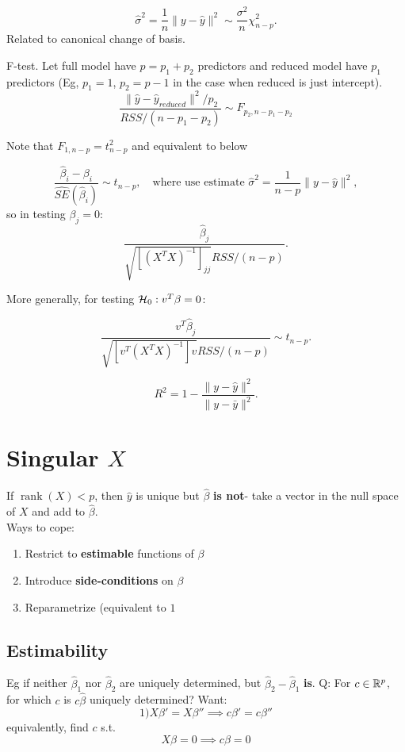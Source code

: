 \documentclass{article}
\newcommand{\rank}{\operatorname{rank}}
\begin{document}
\begin{fact}
$$\hat \sigma^2 = \frac{1}{n} \|y - \hat y\|^2 \sim \frac{\sigma^2}{n} \chi^2_{n-p}.$$
Related to canonical change of basis. 
\end{fact}
\begin{fact}[F-Test]
F-test. Let full model have $p = p_1 + p_2$ predictors and reduced model have $p_1$ predictors (Eg, $p_1 = 1$, $p_2 = p-1$ in the case when reduced is just intercept).
$$\frac{\|\hat y - \hat y_{reduced} \|^2/p_2}{RSS/(n-p_1 - p_2)}\sim F_{p_2, n-p_1 - p_2}$$

Note that $F_{1,n-p} = t^2_{n-p}$ and equivalent to below
\end{fact}
\begin{fact}[T-test]
$$\frac{\hat \beta_i - \beta_i}{\widehat{SE} (\hat \beta_i)} \sim t_{n-p}, \quad \text{where use estimate }  \hat \sigma^2 = \frac{1}{n-p} \|y-\hat y\|^2,$$
so in testing $\beta_j = 0$:
$$\frac{\hat \beta_j }{\sqrt{ [(X^TX)^{-1} ]_{jj}}RSS/(n-p)}.$$

More generally, for testing $\mathcal H_0: v^T \beta = 0$:

$$\frac{v^T \hat \beta_j }{\sqrt{ [v^T (X^TX)^{-1} ]v}RSS/(n-p)}\sim t_{n-p}.$$
\end{fact}


\begin{definition}[$R^2$]
    $$R^2 = 1 - \frac{\|y - \hat y\|^2}{\| y - \bar y\|^2}.$$
\end{definition}


\section{Singular $X$}
If $\rank(X)<p$, then $\hat y$ is unique but $\hat \beta$ \textbf{is not}- take a vector in the null space of $X$ and add to $\hat \beta$. \\
Ways to cope:
\begin{enumerate}
    \item Restrict to \textbf{estimable} functions of $\beta$
    \item Introduce \textbf{side-conditions} on $\beta$
    \item Reparametrize (equivalent to $1$

\end{enumerate}
\subsection{Estimability}
Eg if neither $\hat \beta_1$ nor $\hat \beta_2$ are uniquely determined, but $\hat \beta_2 - \hat \beta_1$ \textbf{is}. Q: For $c\in \mathbb R^p$, for which $c$ is $c\hat \beta$ uniquely determined?  Want:
$$1) X\beta' = X\beta '' \implies c\beta' = c\beta'' $$
equivalently, find $c$ s.t.
$$X\beta = 0 \implies c\beta = 0$$
\end{document}
